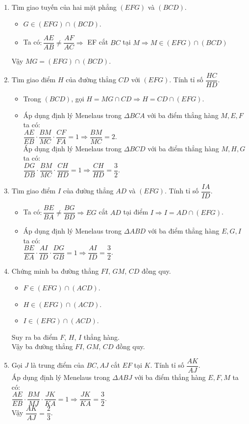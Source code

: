 \begin{bt}
\begin{bt}
{		\begin{enumerate}
			\item Tìm giao tuyến của hai mặt phẳng $(EFG)$ và $(BCD)$.
			\begin{itemize}
				\item $G \in (EFG) \cap (BCD)$.
				\item Ta có$\colon \dfrac{AE}{AB} \neq \dfrac{AF}{AC} \Rightarrow $ EF cắt $BC$ tại $M \Rightarrow M \in (EFG)\cap (BCD)$
			\end{itemize}
			Vậy $MG =(EFG)\cap (BCD)$.
			\item Tìm giao điểm $H$ của đường thẳng $CD$ với $(EFG)$. Tính tỉ số $\dfrac{HC}{HD}$.
			\begin{itemize}
				\item Trong $(BCD)$, gọi $H =MG \cap CD \Rightarrow H =CD \cap (EFG)$.
				\item Áp dụng định lý Menelaus trong $\Delta BCA$ với ba điểm thẳng hàng $M, E, F$ ta có$\colon$\\$\dfrac{AE}{EB}\cdot \dfrac{BM}{MC}\cdot \dfrac{CF}{FA}=1 \Rightarrow \dfrac{BM}{MC}=2$.
				\\Áp dụng định lý Menelaus trong $\Delta BCD$ với ba điểm thẳng hàng $M, H, G$ ta có$\colon$\\$\dfrac{DG}{DB}\cdot \dfrac{BM}{MC}\cdot \dfrac{CH}{HD}=1 \Rightarrow \dfrac{CH}{HD}=\dfrac{3}{2}$.
			\end{itemize}
			\item Tìm giao điểm $I$ của đường thẳng $AD$ và $(EFG)$. Tính tỉ số $\dfrac{IA}{ID}$.
			\begin{itemize}
				\item Ta có$\colon \dfrac{BE}{BA}\neq \dfrac{BG}{BD} \Rightarrow EG$ cắt $AD$ tại điểm $I \Rightarrow I = AD \cap (EFG)$.
				\item Áp dụng định lý Menelaus trong $\Delta ABD$ với ba điểm thẳng hàng $E, G, I$ ta có$\colon$\\$\dfrac{BE}{EA}\cdot \dfrac{AI}{ID}\cdot \dfrac{DG}{GB}=1 \Rightarrow \dfrac{AI}{ID}=\dfrac{3}{2}$.
			\end{itemize}
			\item Chứng minh ba đường thẳng $FI$, $GM$, $CD$ đồng quy.
			\begin{itemize}
				\item $F\in (EFG)\cap (ACD)$.
				\item $H \in (EFG)\cap (ACD)$.
				\item $I \in (EFG)\cap (ACD)$.
			\end{itemize}
			Suy ra ba điểm $F$, $H$, $I$ thẳng hàng.\\
			Vậy ba đường thẳng $FI$, $GM$, $CD$ đồng quy.
			\item Gọi $J$ là trung điểm của $BC, AJ$ cắt $EF$ tại $K$. Tính tỉ số $\dfrac{AK}{AJ}$.\\
			Áp dụng định lý Menelaus trong $\Delta ABJ$ với ba điểm thẳng hàng $E, F, M$ ta có$\colon$\\$\dfrac{AE}{EB}\cdot \dfrac{BM}{MJ}\cdot \dfrac{JK}{KA}=1 \Rightarrow \dfrac{JK}{KA}=\dfrac{3}{2}$.\\
			Vậy $\dfrac{AK}{AJ}=\dfrac{2}{3}$.
		\end{enumerate}
	}
	

\end{bt}
\end{bt}
